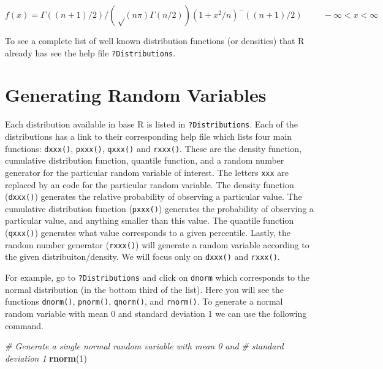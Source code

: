 \documentclass[
]{book}
\newenvironment{Shaded}{\begin{snugshade}}{\end{snugshade}}
\newcommand{\CommentTok}[1]{\textcolor[rgb]{0.56,0.35,0.01}{\textit{#1}}}
\newcommand{\DecValTok}[1]{\textcolor[rgb]{0.00,0.00,0.81}{#1}}
\newcommand{\KeywordTok}[1]{\textcolor[rgb]{0.13,0.29,0.53}{\textbf{#1}}}
\newcommand{\NormalTok}[1]{#1}
\begin{document}
\[f(x) = Γ((n+1)/2) / (√(n π) Γ(n/2)) (1 + x^2/n)^-((n+1)/2)\hspace{1cm} -\infty <x < \infty\]

To see a complete list of well known distribution functions (or densities) that R already has see the help file \texttt{?Distributions}.

\hypertarget{generating-random-variables}{%
\section{Generating Random Variables}\label{generating-random-variables}}

Each distribution available in base R is listed in \texttt{?Distributions}. Each of the distributions has a link to their corresponding help file which lists four main functions: \texttt{dxxx()}, \texttt{pxxx()}, \texttt{qxxx()} and \texttt{rxxx()}. These are the density function, cumulative distribution function, quantile function, and a random number generator for the particular random variable of interest. The letters \texttt{xxx} are replaced by an code for the particular random variable. The density function (\texttt{dxxx()}) generates the relative probability of observing a particular value. The cumulative distribution function (\texttt{pxxx()}) generates the probability of observing a particular value, and anything smaller than this value. The quantile function (\texttt{qxxx()}) generates what value corresponds to a given percentile. Lastly, the random number generator (\texttt{rxxx()}) will generate a random variable according to the given distribuiton/density. We will focus only on \texttt{dxxx()} and \texttt{rxxx()}.

For example, go to \texttt{?Distributions} and click on \texttt{dnorm} which corresponds to the normal distribution (in the bottom third of the list). Here you will see the functions \texttt{dnorm()}, \texttt{pnorm()}, \texttt{qnorm()}, and \texttt{rnorm()}. To generate a normal random variable with mean 0 and standard deviation 1 we can use the following command.

\begin{Shaded}
\begin{Highlighting}[]
\CommentTok{# Generate a single normal random variable with mean 0 and}
\CommentTok{# standard deviation 1}
\KeywordTok{rnorm}\NormalTok{(}\DecValTok{1}\NormalTok{)}
\end{Highlighting}
\end{Shaded}
\end{document}
